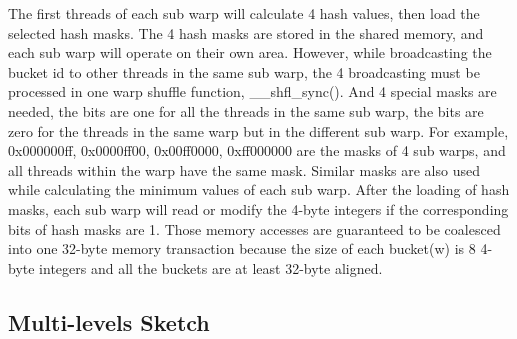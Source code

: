 \documentclass[conference]{IEEEtran}
\begin{document}
The first threads of each sub warp will calculate 4 hash values, then load the selected hash masks. The 4 hash masks are stored in the shared memory, and each sub warp will operate on their own area. However, while broadcasting the bucket id to other threads in the same sub warp, the 4 broadcasting must be processed in one warp shuffle function, \_\_shfl\_sync(). And 4 special masks are needed, the bits are one for all the threads in the same sub warp, the bits are zero for the threads in the same warp but in the different sub warp. For example, 0x000000ff, 0x0000ff00, 0x00ff0000, 0xff000000 are the masks of 4 sub warps, and all threads within the warp have the same mask. Similar masks are also used while calculating the minimum values of each sub warp. After the loading of hash masks, each sub warp will read or modify the 4-byte integers if the corresponding bits of hash masks are 1. Those memory accesses are guaranteed to be coalesced into one 32-byte memory transaction because the size of each bucket(w) is 8 4-byte integers and all the buckets are at least 32-byte aligned.





\subsection{Multi-levels Sketch}
\end{document}
